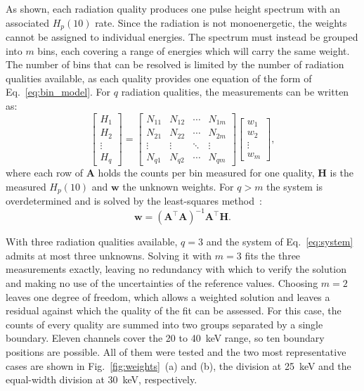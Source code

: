 As shown, each radiation quality produces one pulse height spectrum with an associated $H_p(10)$ rate. Since the radiation is not monoenergetic, the weights cannot be assigned to individual energies. The spectrum must instead be grouped into $m$ bins, each covering a range of energies which will carry the same weight. The number of bins that can be resolved is limited by the number of radiation qualities available, as each quality provides one equation of the form of Eq.~\ref{eq:bin_model}. For $q$ radiation qualities, the measurements can be written as:
\begin{equation}
\begin{bmatrix}
H_1 \\ H_2 \\ \vdots \\ H_q
\end{bmatrix}
=
\begin{bmatrix}
N_{11} & N_{12} & \cdots & N_{1m} \\
N_{21} & N_{22} & \cdots & N_{2m} \\
\vdots & \vdots  & \ddots & \vdots \\
N_{q1} & N_{q2} & \cdots & N_{qm}
\end{bmatrix}
\begin{bmatrix}
w_1 \\ w_2 \\ \vdots \\ w_m
\end{bmatrix},
\label{eq:system}
\end{equation}
where each row of $\mathbf{A}$ holds the counts per bin measured for one quality, $\mathbf{H}$ is the measured $H_p(10)$ and $\mathbf{w}$ the unknown weights. For $q > m$ the system is overdetermined and is solved by the least-squares method~\cite{portable}:
\begin{equation}
\mathbf{w} = \left(\mathbf{A}^{\!\top}\mathbf{A}\right)^{-1}
\mathbf{A}^{\!\top}\mathbf{H} .
\label{eq:lsq}
\end{equation}

With three radiation qualities available, $q = 3$ and the system of Eq.~\ref{eq:system} admits at most three unknowns. Solving it with $m = 3$ fits the three measurements exactly, leaving no redundancy with which to verify the solution and making no use of the uncertainties of the reference values. Choosing $m = 2$ leaves one degree of freedom, which allows a weighted solution and leaves a residual against which the quality of the fit can be assessed. For this case, the counts of every quality are summed into two groups separated by a single boundary. Eleven channels cover the 20 to 40~keV range, so ten boundary positions are possible. All of them were tested and the two most representative cases are shown in Fig.~\ref{fig:weights}~(a) and (b), the division at 25~keV and the equal-width division at 30~keV, respectively.

